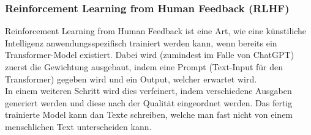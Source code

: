 \documentclass[twocolumn,10pt]{article}
\begin{document}
	\subsubsection{Reinforcement Learning from Human Feedback (RLHF)}
	Reinforcement Learning from Human Feedback ist eine Art, wie eine künstiliche Intelligenz anwendungsspezifisch trainiert werden kann, wenn bereits ein Transformer-Model existiert. Dabei wird (zumindest im Falle von ChatGPT) zuerst die Gewichtung ausgebaut, indem eine Prompt (Text-Input für den Transformer) gegeben wird und ein Output, welcher erwartet wird.\\
	In einem weiteren Schritt wird dies verfeinert, indem verschiedene Ausgaben generiert werden und diese nach der Qualität eingeordnet werden. Das fertig trainierte Model kann dan Texte schreiben, welche man fast nicht von einem menschlichen Text unterscheiden kann.
\end{document}
